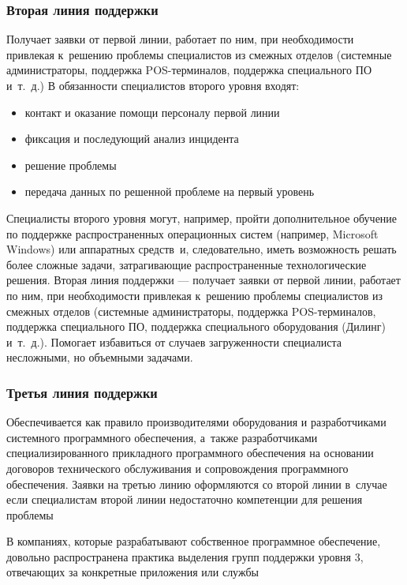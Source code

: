 \documentclass{../industrial-development}
\begin{document}
\begin{frame} \frametitle{Вторая линия поддержки}

    Получает заявки от первой линии, работает по ним, при необходимости привлекая к~решению проблемы специалистов из смежных отделов (системные администраторы, поддержка POS-терминалов, поддержка специального ПО и~т.~д.)
    \newline
    \newline
    В обязанности специалистов второго уровня входят: 
	\begin{itemize}
        \item контакт и оказание помощи персоналу первой линии
        \item фиксация и последующий анализ инцидента
        \item решение проблемы
        \item передача данных по решенной проблеме на первый уровень
	\end{itemize}
\end{frame}
\lecturenotes
Специалисты второго уровня могут, например, пройти дополнительное обучение по поддержке распространенных операционных систем (например, Microsoft Windows) или аппаратных средств~и, следовательно, иметь возможность решать более сложные задачи, затрагивающие распространенные технологические решения.
Вторая линия поддержки — получает заявки от первой линии, работает по ним, при необходимости привлекая к~решению проблемы специалистов из смежных отделов (системные администраторы, поддержка POS-терминалов, поддержка специального ПО, поддержка специального оборудования (Дилинг) и~т.~д.). Помогает избавиться от случаев загруженности специалиста несложными, но объемными задачами.

\begin{frame} \frametitle{Третья линия поддержки}

    Обеспечивается как правило производителями оборудования и разработчиками системного программного обеспечения, а~также разработчиками специализированного прикладного программного обеспечения на основании договоров технического обслуживания и сопровождения программного обеспечения.
    \newline
    \newline
    Заявки на третью линию оформляются со второй линии в~случае если специалистам второй линии недостаточно компетенции для решения проблемы  

\end{frame}
\lecturenotes
В компаниях, которые разрабатывают собственное программное обеспечение, довольно распространена практика выделения групп поддержки уровня 3, отвечающих за конкретные приложения или службы
\end{document}
